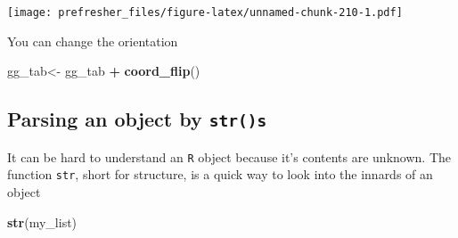 \documentclass[]{book}
\newenvironment{Shaded}{\begin{snugshade}}{\end{snugshade}}
\newcommand{\KeywordTok}[1]{\textcolor[rgb]{0.13,0.29,0.53}{\textbf{#1}}}
\newcommand{\DataTypeTok}[1]{\textcolor[rgb]{0.13,0.29,0.53}{#1}}
\newcommand{\StringTok}[1]{\textcolor[rgb]{0.31,0.60,0.02}{#1}}
\newcommand{\OperatorTok}[1]{\textcolor[rgb]{0.81,0.36,0.00}{\textbf{#1}}}
\newcommand{\NormalTok}[1]{#1}
\theoremstyle{definition}
\theoremstyle{definition}
\theoremstyle{definition}
\theoremstyle{remark}
\begin{document}
\begin{Shaded}
\end{Shaded}

\texttt{[image: prefresher\_files/figure-latex/unnamed-chunk-210-1.pdf]}

You can change the orientation

\begin{Shaded}
\begin{Highlighting}[]
\NormalTok{gg_tab<-}\StringTok{ }\NormalTok{gg_tab }\OperatorTok{+}\StringTok{ }\KeywordTok{coord_flip}\NormalTok{()}
\end{Highlighting}
\end{Shaded}

\subsection{\texorpdfstring{Parsing an object by
\texttt{str()s}}{Parsing an object by str()s}}\label{parsing-an-object-by-strs}

It can be hard to understand an \texttt{R} object because it's contents
are unknown. The function \texttt{str}, short for structure, is a quick
way to look into the innards of an object

\begin{Shaded}
\begin{Highlighting}[]
\KeywordTok{str}\NormalTok{(my_list)}
\end{Highlighting}
\end{Shaded}
\end{document}
